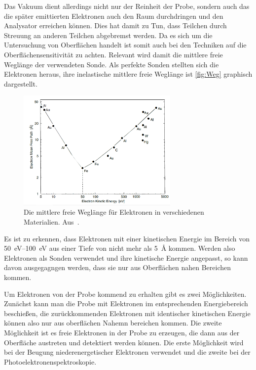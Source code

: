         Das Vakuum dient allerdings nicht nur der Reinheit der Probe, sondern auch das die später emittierten Elektronen auch den Raum durchdringen und den Analysator erreichen können.
        Dies hat damit zu Tun, dass Teilchen durch Streuung an anderen Teilchen abgebremst werden.
        Da es sich um die Untersuchung von Oberflächen handelt ist somit auch bei den Techniken auf die Oberflächensensitivität zu achten.
        Relevant wird damit die mittlere freie Weglänge der verwendeten Sonde.
        Als perfekte Sonden stellten sich die Elektronen heraus, ihre inelastische mittlere freie Weglänge ist \autoref{fig:Weg} graphisch dargestellt.
        \begin{figure}
            \centering
            \includegraphics[width=0.7\textwidth]{./content/Weg}
            \caption{Die mittlere freie Weglänge für Elektronen in verschiedenen Materialien. Aus~\cite{Hüfner}.}
            \label{fig:Weg}
        \end{figure}
        Es ist zu erkennen, dass Elektronen mit einer kinetischen Energie im Bereich von \SIrange{50}{100}{\electronvolt} aus einer Tiefe von nicht mehr als \SI{5}{\angstrom} kommen.
        Werden also Elektronen als Sonden verwendet und ihre kinetische Energie angepasst, so kann davon ausgegagngen werden, dass sie nur aus Oberflächen nahen Bereichen kommen.

        Um Elektronen von der Probe kommend zu erhalten gibt es zwei Möglichkeiten.
        Zunächst kann man die Probe mit Elektronen im entsprechenden Energiebereich beschießen, die zurückkommenden Elektronen mit identischer kinetischen Energie können also nur aus oberflächen Nahemn bereichen kommen.
        Die zweite Möglichkeit ist es freie Elektronen in der Probe zu erzeugen, die dann aus der Oberfläche austreten und detektiert werden können.
        Die erste Möglichkeit wird bei der Beugung niederenergetischer Elektronen verwendet und die zweite bei der Photoelektronenspektroskopie.


